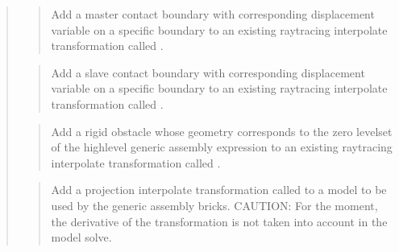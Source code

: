 \documentclass[a4paper,11pt,english]{sphinxmanual}
\begin{document}
\begin{quote}
\sphinxAtStartPar
{}
\begin{quote}

\sphinxAtStartPar
Add a master contact boundary with corresponding displacement variable
 on a specific boundary  to an existing raytracing
interpolate transformation called .
\end{quote}

\sphinxAtStartPar
{}
\begin{quote}

\sphinxAtStartPar
Add a slave contact boundary with corresponding displacement variable
 on a specific boundary  to an existing raytracing
interpolate transformation called .
\end{quote}

\sphinxAtStartPar
{}
\begin{quote}

\sphinxAtStartPar
Add a rigid obstacle whose geometry corresponds to the zero level\sphinxhyphen{}set
of the high\sphinxhyphen{}level generic assembly expression 
to an existing raytracing interpolate transformation called .
\end{quote}

\sphinxAtStartPar
{}
\begin{quote}

\sphinxAtStartPar
Add a projection interpolate transformation called  to a model
to be used by the generic assembly bricks.
CAUTION: For the moment, the derivative of the
transformation is not taken into account in the model solve.
\end{quote}

\sphinxAtStartPar
{}
\begin{quote}


\end{quote}
\end{quote}
\end{document}

